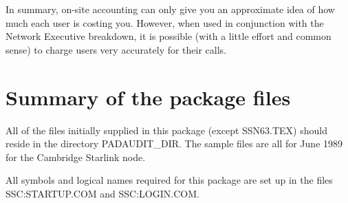 In summary, on-site accounting can only give you an approximate idea
of how much each user is costing you. However, when used in conjunction
with the Network Executive breakdown, it is possible (with a little effort
and common sense) to charge users very accurately for their calls.


\section {Summary of the package files}

All of the files initially supplied in this package (except SSN63.TEX) should
reside in the directory PADAUDIT\_\/DIR. The sample files are all for June 1989
for the  Cambridge Starlink node.

All symbols and logical names required for this package are set up in
the files SSC:STARTUP.COM and SSC:LOGIN.COM.


